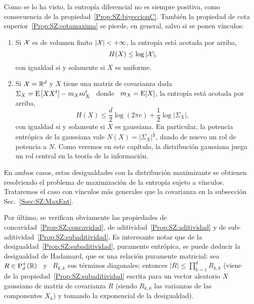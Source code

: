 Como se  lo ha  visto, la  entrop\'ia diferencial no  es siempre  positiva, como
consecuencia de  la propiedad~\ref{Prop:SZ:biyeccionC}.  Tambi\'en  la propiedad
de cota  superior~\ref{Prop:SZ:cotamaxima} se  pierde, en  general, salvo  si se
ponen v\'inculos:
%
\begin{propiedadesC}\setcounter{enumi}{\value{PropCotamaxima}}
\item
  \begin{enumerate}
  \item\label{Prop:SZ:cotamaximauniforme} Si $\mathcal{X}$ es de volumen finito $|\mathcal{X}| < +
    \infty$, la entrop\'ia est\'a acotada por arriba,
    \[
    H(X) \le \log |\mathcal{X}|,
    \]
    con igualdad si y solamente si $X$ es uniforme.
  \item\label{Prop:SZ:cotamaximagaussiana}  Si $\mathcal{X}  =\mathbb{R}^d$  y  $X$ tiene  una
    matriz  de covarianza  dada \  $\Sigma_X =  \operatorname{E}\left[ X  X^t \right]  - m_X
    m_X^t$ \  donde \ $m_X  = \operatorname{E}[X]$, la  entrop\'ia est\'a  acotada por
    arriba,
    \[
    H(X) \le \frac{d}{2} \log(2 \pi e) + \frac12 \log |\Sigma_X|,
    \]
    con igualdad si y solamente si $X$ es gaussiana.  En particular, la potencia
    entr\'opica de la gaussiana vale $N(X) = \left| \Sigma_X \right|^{\frac1d}$,
    dando de nuevo un  rol de potencia a $N$.  Como  veremos en este cap\'itulo,
    la  distribuci\'on gaussiana  juega  un rol  central en  la  teor\'ia de  la
    informaci\'on.
  \end{enumerate}
  En  ambos casos,  estas  desigualdades con  la  distribuci\'on maximizante  se
    obtienen resolviendo el problema de maximizaci\'on de la entrop\'ia sujeto a
    v\'inculos.   Trataremos  el caso  con  v\'inculos  m\'as generales  que  la
    covarianza en la subsecci\'on Sec.~\ref{Ssec:SZ:MaxEnt}.
\end{propiedadesC}

Por    \'ultimo,     se    verifican     obviamente    las     propiedades    de
concavidad~\ref{Prop:SZ:concavidad}, de aditividad~\ref{Prop:SZ:aditividad} y de
sub-aditividad~\ref{Prop:SZ:subaditividad}.   Es  interesante  notar que  de  la
desigualdad~\ref{Prop:SZ:subaditividad}, puramente entr\'opica, se puede deducir
la  desigualdad de  Hadamard, que  es  una relaci\'on  puramente matricial:  sea
$R  \in \mathrm{P}_d^+(\mathbb{R})$  \ y  \ $R_{k,k}$  sus t\'erminos  diagonales; entonces
$\displaystyle    |R|    \le    \prod_{k=1}^d     R_{k,k}$    (viene    de    la
propiedad~\ref{Prop:SZ:subaditividad}  escrita  para  un  vector  aleatorio  $X$
gaussiano de  matriz de covarianza  $R$ (siendo  $R_{k,k}$ las varianzas  de las
componentes $X_k$) y tomando la exponencial de la desigualdad).

